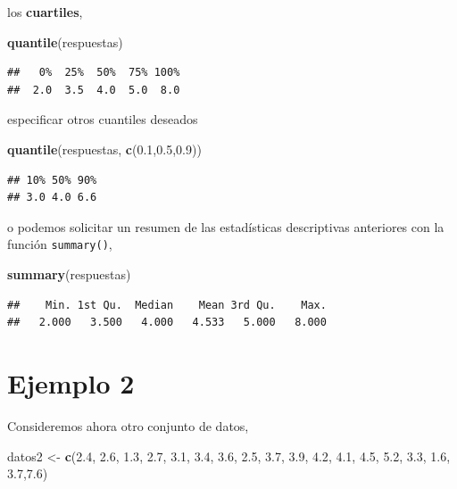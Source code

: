 \documentclass[
]{book}
\newenvironment{Shaded}{\begin{snugshade}}{\end{snugshade}}
\newcommand{\FloatTok}[1]{\textcolor[rgb]{0.00,0.00,0.81}{#1}}
\newcommand{\FunctionTok}[1]{\textcolor[rgb]{0.13,0.29,0.53}{\textbf{#1}}}
\newcommand{\NormalTok}[1]{#1}
\newcommand{\OtherTok}[1]{\textcolor[rgb]{0.56,0.35,0.01}{#1}}
\begin{document}
los \textbf{cuartiles},

\begin{Shaded}
\begin{Highlighting}[]
\FunctionTok{quantile}\NormalTok{(respuestas)}
\end{Highlighting}
\end{Shaded}

\begin{verbatim}
##   0%  25%  50%  75% 100% 
##  2.0  3.5  4.0  5.0  8.0
\end{verbatim}

especificar otros cuantiles deseados

\begin{Shaded}
\begin{Highlighting}[]
\FunctionTok{quantile}\NormalTok{(respuestas, }\FunctionTok{c}\NormalTok{(}\FloatTok{0.1}\NormalTok{,}\FloatTok{0.5}\NormalTok{,}\FloatTok{0.9}\NormalTok{))}
\end{Highlighting}
\end{Shaded}

\begin{verbatim}
## 10% 50% 90% 
## 3.0 4.0 6.6
\end{verbatim}

o podemos solicitar un resumen de las estadísticas descriptivas anteriores con la función \texttt{summary()},

\begin{Shaded}
\begin{Highlighting}[]
\FunctionTok{summary}\NormalTok{(respuestas)}
\end{Highlighting}
\end{Shaded}

\begin{verbatim}
##    Min. 1st Qu.  Median    Mean 3rd Qu.    Max. 
##   2.000   3.500   4.000   4.533   5.000   8.000
\end{verbatim}

\hypertarget{ejemplo-2}{%
\section{Ejemplo 2}\label{ejemplo-2}}

Consideremos ahora otro conjunto de datos,

\begin{Shaded}
\begin{Highlighting}[]
\NormalTok{datos2 }\OtherTok{\textless{}{-}} \FunctionTok{c}\NormalTok{(}\FloatTok{2.4}\NormalTok{, }\FloatTok{2.6}\NormalTok{, }\FloatTok{1.3}\NormalTok{, }\FloatTok{2.7}\NormalTok{, }\FloatTok{3.1}\NormalTok{, }\FloatTok{3.4}\NormalTok{, }\FloatTok{3.6}\NormalTok{, }\FloatTok{2.5}\NormalTok{, }\FloatTok{3.7}\NormalTok{, }
            \FloatTok{3.9}\NormalTok{, }\FloatTok{4.2}\NormalTok{, }\FloatTok{4.1}\NormalTok{, }\FloatTok{4.5}\NormalTok{, }\FloatTok{5.2}\NormalTok{, }\FloatTok{3.3}\NormalTok{, }\FloatTok{1.6}\NormalTok{, }\FloatTok{3.7}\NormalTok{,}\FloatTok{7.6}\NormalTok{)}
\end{Highlighting}
\end{Shaded}
\end{document}
